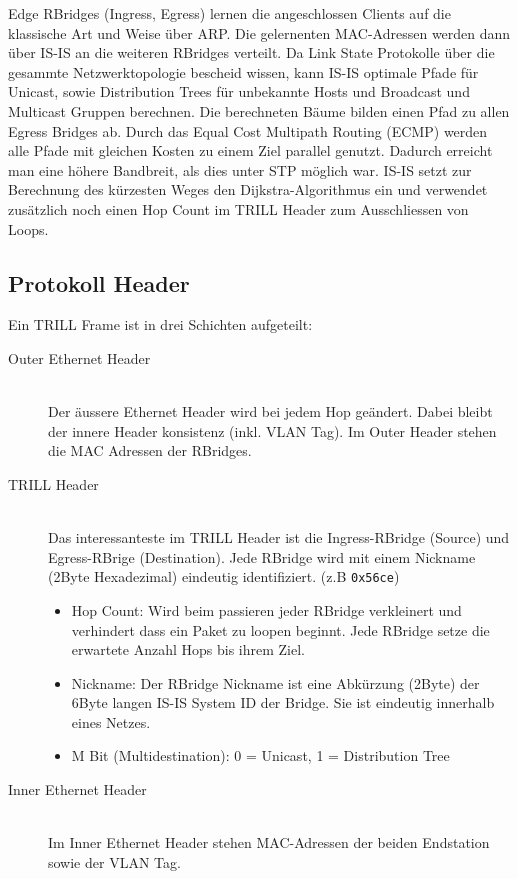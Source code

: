 Edge RBridges (Ingress, Egress) lernen die angeschlossen Clients auf die klassische Art und Weise über ARP. Die gelernenten MAC-Adressen werden dann über IS-IS an die weiteren RBridges verteilt. Da Link State Protokolle über die gesammte Netzwerktopologie bescheid wissen, kann IS-IS optimale Pfade für Unicast, sowie Distribution Trees für unbekannte Hosts und Broadcast und Multicast Gruppen berechnen. Die berechneten Bäume bilden einen Pfad zu allen Egress Bridges ab. Durch das Equal Cost Multipath Routing (ECMP) werden alle Pfade mit gleichen Kosten zu einem Ziel parallel genutzt. Dadurch erreicht man eine höhere Bandbreit, als dies unter STP möglich war. IS-IS setzt zur Berechnung des kürzesten Weges den Dijkstra-Algorithmus ein und verwendet zusätzlich noch einen Hop Count im TRILL Header zum Ausschliessen von Loops.

\subsection{Protokoll Header}
Ein TRILL Frame ist in drei Schichten aufgeteilt:
\begin{description}
	\item[Outer Ethernet Header] \hfill \\
	Der äussere Ethernet Header wird bei jedem Hop geändert. Dabei bleibt der innere Header konsistenz (inkl. VLAN Tag). Im Outer Header stehen die MAC Adressen der RBridges.
	\item[TRILL Header] \hfill \\
	Das interessanteste im TRILL Header ist die Ingress-RBridge (Source) und Egress-RBrige (Destination). Jede RBridge wird mit einem Nickname (2Byte Hexadezimal) eindeutig identifiziert. (z.B \lstinline[]|0x56ce|) 
	\begin{itemize}
		\item Hop Count: Wird beim passieren jeder RBridge verkleinert und verhindert dass ein Paket zu loopen beginnt. Jede RBridge setze die erwartete Anzahl Hops bis ihrem Ziel.
		\item Nickname: Der RBridge Nickname ist eine Abkürzung (2Byte) der 6Byte langen IS-IS System ID der Bridge. Sie ist eindeutig innerhalb eines Netzes. 
		\item M Bit (Multidestination): 0 = Unicast, 1 = Distribution Tree
	\end{itemize}
	\item[Inner Ethernet Header] \hfill \\
	Im Inner Ethernet Header stehen MAC-Adressen der beiden Endstation sowie der VLAN Tag.
\end{description}

